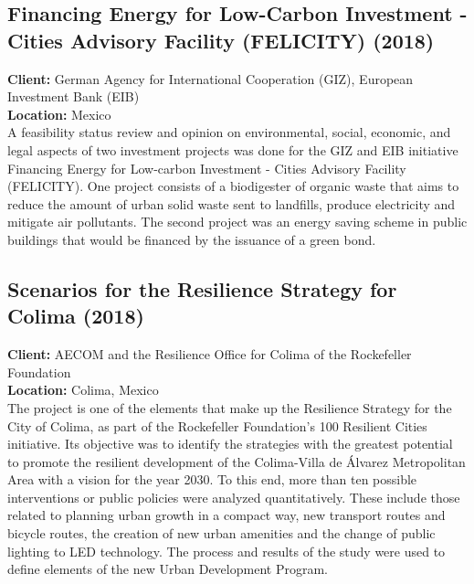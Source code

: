 \documentclass[
	a4paper,
	12pt,
	unnumberedsections,
]{CSSullivanBusinessReport}
\begin{document}
\subsection{Financing Energy for Low-Carbon Investment - Cities Advisory Facility (FELICITY) (2018)}
\textbf{Client:}  German Agency for International Cooperation (GIZ), European Investment Bank (EIB) \\
\textbf{Location:}  Mexico \\[0.5em]
 A feasibility status review and opinion on environmental, social, economic, and legal aspects of two investment projects was done for the GIZ and EIB initiative Financing Energy for Low-carbon Investment - Cities Advisory Facility (FELICITY). One project consists of a biodigester of organic waste that aims to reduce the amount of urban solid waste sent to landfills, produce electricity and mitigate air pollutants. The second project was an energy saving scheme in public buildings that would be financed by the issuance of a green bond.

\subsection{Scenarios for the Resilience Strategy for Colima (2018)}
\textbf{Client:}  AECOM and the Resilience Office for Colima of the Rockefeller Foundation \\
\textbf{Location:}  Colima, Mexico \\[0.5em]
 The project is one of the elements that make up the Resilience Strategy for the City of Colima, as part of the Rockefeller Foundation's 100 Resilient Cities initiative. Its objective was to identify the strategies with the greatest potential to promote the resilient development of the Colima-Villa de Álvarez Metropolitan Area with a vision for the year 2030. To this end, more than ten possible interventions or public policies were analyzed quantitatively. These include those related to planning urban growth in a compact way, new transport routes and bicycle routes, the creation of new urban amenities and the change of public lighting to LED technology. The process and results of the study were used to define elements of the new Urban Development Program.
\end{document}
